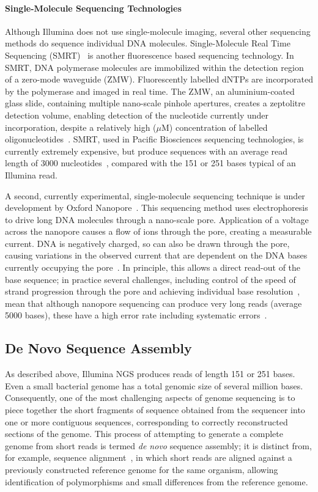 \paragraph{Single-Molecule Sequencing Technologies}
Although Illumina does not use single-molecule imaging, several other sequencing methods do sequence individual DNA molecules. Single-Molecule Real Time Sequencing (SMRT)~\cite{eid2008} is another fluorescence based sequencing technology. In SMRT, DNA polymerase molecules are immobilized within the detection region of a zero-mode waveguide (ZMW). Fluorescently labelled dNTPs are incorporated by the polymerase and imaged in real time. The ZMW, an aluminium-coated glass slide, containing multiple nano-scale pinhole apertures, creates a zeptolitre detection volume, enabling detection of the nucleotide currently under incorporation, despite a relatively high ($\mu$M) concentration of labelled oligonucleotides~\cite{Levene2003}. SMRT, used in Pacific Biosciences sequencing technologies, is currently extremely expensive, but produce sequences with an average read length of 3000 nucleotides~\cite{Roberts2013}, compared with the 151 or 251 bases typical of an Illumina read.

A second, currently experimental, single-molecule sequencing technique is under development by Oxford Nanopore~\cite{Bayley2014}. This sequencing method uses electrophoresis to drive long DNA molecules through a nano-scale pore. Application of a voltage across the nanopore causes a flow of ions through the pore, creating a measurable current. DNA is negatively charged, so can also be drawn through the pore, causing variations in the observed current that are dependent on the DNA bases currently occupying the pore~\cite{Branton2008}. In principle, this allows a direct read-out of the base sequence; in practice several challenges, including control of the speed of strand progression through the pore and achieving individual base resolution~\cite{Laszlo2014}, mean that although nanopore sequencing can produce very long reads (average 5000 bases), these have a high error rate including systematic errors~\cite{Mikheyev2014}.  

\subsection{De Novo Sequence Assembly}
As described above, Illumina NGS produces reads of length 151 or 251 bases. Even a small bacterial genome has a total genomic size of several million bases. Consequently, one of the most challenging aspects of genome sequencing is to piece together the short fragments of sequence obtained from the sequencer into one or more contiguous sequences, corresponding to correctly reconstructed sections of the genome. This process of attempting to generate a complete genome from short reads is termed \textit{de novo} sequence assembly; it is distinct from, for example, sequence alignment~\cite{Li2010}, in which short reads are aligned against a previously constructed reference genome for the same organism, allowing identification of polymorphisms and small differences from the reference genome. 

